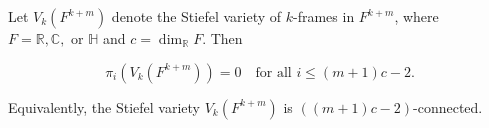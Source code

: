 Let $V_k(F^{k+m})$ denote the Stiefel variety of $k$-frames in $F^{k+m}$, where $F = \mathbb{R}, \mathbb{C}, \text{ or } \mathbb{H}$ and $c = \dim_{\mathbb{R}} F$. Then

$$\pi_i(V_k(F^{k+m})) = 0 \quad \text{for all } i \leq (m+1)c - 2.$$

Equivalently, the Stiefel variety $V_k(F^{k+m})$ is $((m+1)c - 2)$-connected.
